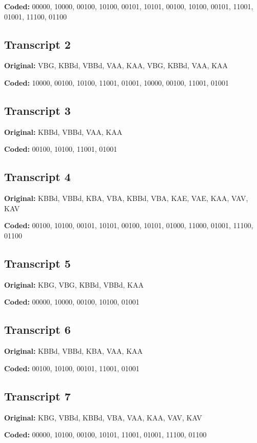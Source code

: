 \documentclass[
  12pt,
  a4paper,
  oneside,
  titlepage
]{article}
\begin{document}
\textbf{Coded:} 00000, 10000, 00100, 10100, 00101, 10101, 00100, 10100, 00101, 11001, 01001, 11100, 01100

\subsection{Transcript 2}
\textbf{Original:} VBG, KBBd, VBBd, VAA, KAA, VBG, KBBd, VAA, KAA

\textbf{Coded:} 10000, 00100, 10100, 11001, 01001, 10000, 00100, 11001, 01001

\subsection{Transcript 3}
\textbf{Original:} KBBd, VBBd, VAA, KAA

\textbf{Coded:} 00100, 10100, 11001, 01001

\subsection{Transcript 4}
\textbf{Original:} KBBd, VBBd, KBA, VBA, KBBd, VBA, KAE, VAE, KAA, VAV, KAV

\textbf{Coded:} 00100, 10100, 00101, 10101, 00100, 10101, 01000, 11000, 01001, 11100, 01100

\subsection{Transcript 5}
\textbf{Original:} KBG, VBG, KBBd, VBBd, KAA

\textbf{Coded:} 00000, 10000, 00100, 10100, 01001

\subsection{Transcript 6}
\textbf{Original:} KBBd, VBBd, KBA, VAA, KAA

\textbf{Coded:} 00100, 10100, 00101, 11001, 01001

\subsection{Transcript 7}
\textbf{Original:} KBG, VBBd, KBBd, VBA, VAA, KAA, VAV, KAV

\textbf{Coded:} 00000, 10100, 00100, 10101, 11001, 01001, 11100, 01100
\end{document}
